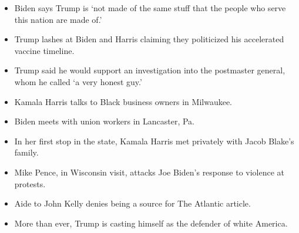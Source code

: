 \begin{itemize}
\item
  \protect\hyperlink{biden-says-trump-is-not-made-of-the-same-stuff-that-the-people-who-serve-this-nation-are-made-of}{}

  Biden says Trump is `not made of the same stuff that the people who
  serve this nation are made of.'
\item
  \protect\hyperlink{trump-lashes-at-biden-and-harris-claiming-they-politicized-his-accelerated-vaccine-timeline}{}

  Trump lashes at Biden and Harris claiming they politicized his
  accelerated vaccine timeline.
\item
  \protect\hyperlink{trump-said-he-would-support-an-investigation-into-the-postmaster-general-whom-he-called-a-very-honest-guy}{}

  Trump said he would support an investigation into the postmaster
  general, whom he called `a very honest guy.'
\item
  \protect\hyperlink{kamala-harris-talks-to-black-business-owners-in-milwaukee}{}

  Kamala Harris talks to Black business owners in Milwaukee.
\item
  \protect\hyperlink{biden-meets-with-union-workers-in-lancaster-pa}{}

  Biden meets with union workers in Lancaster, Pa.
\item
  \protect\hyperlink{in-her-first-stop-in-the-state-kamala-harris-met-privately-with-jacob-blakes-family}{}

  In her first stop in the state, Kamala Harris met privately with Jacob
  Blake's family.
\item
  \protect\hyperlink{mike-pence-in-wisconsin-visit-attacks-joe-bidens-response-to-violence-at-protests}{}

  Mike Pence, in Wisconsin visit, attacks Joe Biden's response to
  violence at protests.
\item
  \protect\hyperlink{aide-to-john-kelly-denies-being-a-source-for-the-atlantic-article}{}

  Aide to John Kelly denies being a source for The Atlantic article.
\item
  \protect\hyperlink{more-than-ever-trump-is-casting-himself-as-the-defender-of-white-america}{}

  More than ever, Trump is casting himself as the defender of white
  America.
\end{itemize}

